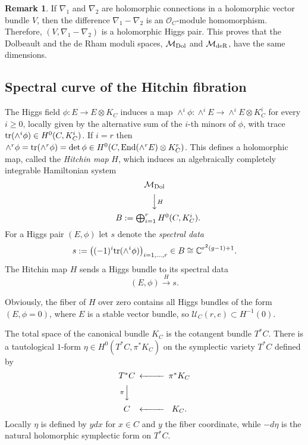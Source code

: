 \documentclass[oneside, 11pt]{amsart}
\theoremstyle{definition}
\newtheorem{rem}[thm]{Remark}
\numberwithin{equation}{subsection}
\def\End{{\text{\rm{End}}}}
\def\tr{{\text{\rm{tr}}}}
\def\Dol{{\text{\rm{Dol}}}}
\def\deR{{\text{\rm{deR}}}}
\newcommand{\be}{\begin{equation}}
\newcommand{\ee}{\end{equation}}
\begin{document}
\begin{rem}
If $\nabla_1$ and $\nabla_2$ are 
holomorphic connections in a 
holomorphic vector bundle $V$, then the difference
$\nabla_1-\nabla_2$ is an $\mathcal{O}_C$-module
homomorphism.  Therefore, $(V, \nabla_1-\nabla_2)$ is a holomorphic
Higgs pair. This proves that the Dolbeault and the de Rham moduli spaces, $\mathcal{M}_{\Dol}$ and $\mathcal{M}_{\deR}$, have the same dimensions.
\end{rem} 

\subsection {Spectral curve of the Hitchin fibration} \label{}
The Higgs field $\phi:E\stackrel{}{\rightarrow}E\otimes K_C$ induces a map $\wedge^i \phi:\wedge^i E\stackrel{}{\rightarrow}\wedge^i E\otimes K_C^i$
for every $i\ge 0$, locally given by the alternative sum of the $i$-th minors of $\phi$, with trace $\tr(\wedge^i \phi)\in H^0(C, K_C^i)$. If $i=r$ then $\wedge^r \phi =\tr (\wedge^r \phi)=\det \phi \in H^0(C, \End (\wedge^r E)\otimes K_C^r)$. This defines a holomorphic map, called the \textit{Hitchin map} $H$, which 
induces an algebraically
completely integrable Hamiltonian system
\be
\label{Hitchin map}
\begin{CD}
\mathcal{M}_{\Dol}
\\
@VV{H}V
\\
\;\;\;B:=\bigoplus_{i=1}^{r}H^0(C, K_{C}^i).
\end{CD}
\ee
For a Higgs pair $(E,\phi)$ let $s$ denote the \textit{spectral data} 
$$s:=\big((-1)^{i}\tr(\wedge^{i}\phi)\big)_{i=1,\dots,r}\in B\cong \mathbb{C}^{r^2(g-1)+1}.$$
The Hitchin map $H$ sends a Higgs bundle  to its spectral data
$$(E,\phi)\stackrel{H}{\rightarrow}s.$$


Obviously, the fiber  of $H$ over zero
contains all Higgs bundles 
of the form $(E, \phi=0)$, where $E$ is a stable vector bundle, so $\mathcal{U}_C(r,e)\subset H^{-1}(0)$.


The total space of the canonical bundle $K_C$ is the cotangent bundle $T^*C$. There is a tautological $1$-form $\eta \in H^0(T^*C,\pi^*K_C)$
on the symplectic variety $T^*C$ defined by
$$
\begin{CD}
T^*C@<<<\pi^*K_C\\
@V{\pi}VV
\\
C@<<< K_C.
\end{CD}
$$
Locally $\eta$ is defined by $ydx$ for $x\in C$ and $y$ the fiber coordinate, while
$-d\eta$ is the natural holomorphic symplectic form on $T^*C$. 
\end{document}

